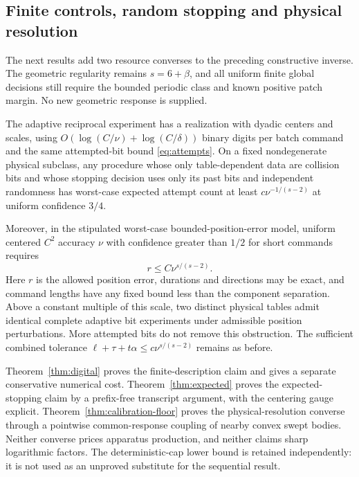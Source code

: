 \subsection{Finite controls, random stopping and physical resolution}
The next results add two resource converses to the preceding constructive
inverse. The geometric regularity remains $s=6+\beta$, and all uniform
finite global decisions still require the bounded periodic class and
known positive patch margin. No new geometric response is supplied.

\begin{theorem}
\label{thm:resources}
The adaptive reciprocal experiment has a realization with dyadic centers
and scales, using $O(\log(C/\nu)+\log(C/\delta))$ binary digits per
batch command and the same attempted-bit bound
\eqref{eq:attempts}. On a fixed nondegenerate physical subclass, any
procedure whose only table-dependent data are collision bits and whose
stopping decision uses only its past bits and independent randomness
has worst-case expected attempt count at least
$c\nu^{-1/(s-2)}$ at uniform confidence $3/4$.

Moreover, in the stipulated worst-case bounded-position-error model,
uniform centered $C^2$ accuracy $\nu$ with confidence greater than
$1/2$ for short commands requires
\[
                            r\le C\nu^{s/(s-2)}.
\]
Here $r$ is the allowed position error, durations and directions may
be exact, and command lengths have any fixed bound less than the
component separation. Above a constant multiple of this scale,
two distinct physical tables admit identical complete adaptive bit
experiments under admissible position perturbations. More attempted
bits do not remove this obstruction. The sufficient combined tolerance
$\ell+\tau+t\alpha\le c\nu^{s/(s-2)}$ remains as before.
\end{theorem}

Theorem~\ref{thm:digital} proves the finite-description claim and gives
a separate conservative numerical cost. Theorem~\ref{thm:expected}
proves the expected-stopping claim by a prefix-free transcript argument,
with the centering gauge explicit. Theorem~\ref{thm:calibration-floor}
proves the physical-resolution converse through a pointwise common-response
coupling of nearby convex swept bodies. Neither converse prices
apparatus production, and neither claims sharp logarithmic factors.
The deterministic-cap lower bound is retained independently: it is
not used as an unproved substitute for the sequential result.
